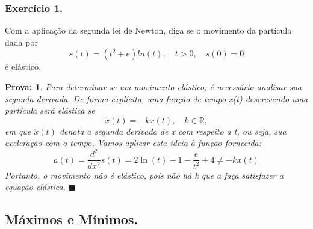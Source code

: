 \documentclass{article}
\newtheorem*{proof*}{\underline{Prova:}}
\renewcommand\qedsymbol{$\blacksquare$}
\begin{document}
\subsubsection{Exerc\'icio 1.}
Com a aplica\c c\~ao da segunda lei de Newton, diga se o movimento da part\'icula
dada por
\[
	s(t) = (t^{2}+ e)ln(t), \quad t>0, \quad s(0) = 0
\]
\'e el\'astico.
\begin{proof*}
	Para determinar se um movimento el\'astico, \'e necess\'ario analisar sua segunda
	derivada. De forma expl\'icita, uma fun\c c\~ao de tempo x(t) descrevendo uma part\'icula
	ser\'a el\'astica se
	\[
		\ddot{x}(t) = -kx(t), \quad k\in\mathbb{R},
	\]
	em que $\ddot{x}(t)$ denota a segunda derivada de x com respeito a t, ou seja,
	sua acelera\c c\~ao com o tempo. Vamos aplicar esta ideia \`a fun\c c\~ao fornecida:
	\[
		a(t) = \frac{d^{2}}{dx^{2}}s(t) = 2\ln (t) -1 - \frac{e}{t^{2}}+ 4 \neq -kx(t)
	\]
	Portanto, o movimento n\~ao \'e el\'astico, pois n\~ao h\'a k que a fa\c ca
	satisfazer a equa\c c\~ao el\'astica. \qedsymbol
\end{proof*}

\subsection{M\'aximos e M\'inimos.}
\end{document}
